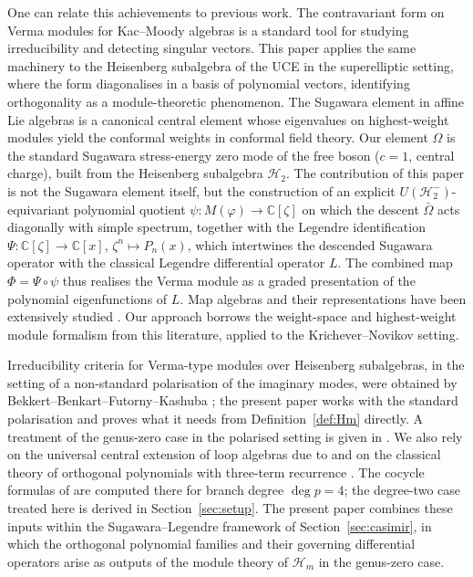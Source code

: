 \documentclass[12pt]{amsart}
\theoremstyle{plain}
\theoremstyle{definition}
\newcommand{\CC}{\mathbb{C}}
\newcommand{\Hm}{{\mathcal{H}_m}}     %
\newcommand{\Mf}{M(\varphi)}          %
\newcommand{\Om}{\Omega}              %
\begin{document}
One can relate this achievements to previous work. The contravariant form on Verma modules for
Kac--Moody algebras \cite{Shapovalov1972,KacRaina} is a standard tool for studying
irreducibility and detecting singular vectors. This paper applies the same machinery
to the Heisenberg subalgebra of the UCE in the superelliptic setting, where the
form diagonalises in a basis of polynomial vectors, identifying orthogonality
as a module-theoretic phenomenon. The Sugawara element in affine Lie algebras
\cite{KacWakimoto1988} is a canonical central element whose eigenvalues on highest-weight
modules yield the conformal weights in conformal field theory. Our element $\Om$ is
the standard Sugawara stress-energy zero mode of the free boson ($c = 1$, central
charge), built from the Heisenberg subalgebra $\mathcal{H}_2$. The contribution
of this paper is not the Sugawara element itself, but the construction of an
explicit $U(\mathcal{H}_2^-)$-equivariant polynomial quotient
$\psi\colon\Mf\to\CC[\zeta]$ on which the descent $\bar\Om$ acts diagonally with
simple spectrum, together with the Legendre identification
$\Psi\colon\CC[\zeta]\to\CC[x]$, $\zeta^n\mapsto P_n(x)$, which intertwines the descended
Sugawara operator with the classical Legendre differential operator $L$. The
combined map $\Phi = \Psi\circ\psi$ thus realises the Verma module as
a graded presentation of the polynomial eigenfunctions of $L$. Map algebras and their representations have been
extensively studied \cite{CoxGuoLuZhao2016_Torus,BilligLau2011}. Our approach borrows
the weight-space and highest-weight module formalism from this literature, applied to the
Krichever--Novikov setting.

Irreducibility criteria for Verma-type modules
over Heisenberg subalgebras, in the setting of a non-standard
polarisation of the imaginary modes, were obtained by
Bekkert--Benkart--Futorny--Kashuba \cite{BBFK2013}; the present paper
works with the standard polarisation and proves what it needs from
Definition~\ref{def:Hm} directly. A treatment of the genus-zero case in
the polarised setting is given in \cite{PhiVerma}.
We also rely on the universal central extension of loop algebras due to
\cite{KasselLoday1982} and on the classical theory of orthogonal
polynomials with three-term recurrence \cite{Szego1939}. The cocycle
formulas of \cite{SantosNeklyudovFutorny2025} are computed there for
branch degree $\deg p = 4$; the degree-two case treated here is derived
in Section~\ref{sec:setup}.
The present paper combines these inputs within the Sugawara--Legendre framework
of Section~\ref{sec:casimir}, in which the orthogonal polynomial families and
their governing differential operators arise as outputs of the module theory of
$\Hm$ in the genus-zero case.
\end{document}
